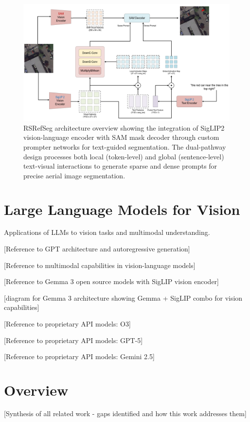 \begin{figure}[H]
\centering
\includegraphics[width=\textwidth]{./Images/clipsam.png}
\caption{RSRefSeg architecture overview showing the integration of SigLIP2 vision-language encoder with SAM mask decoder through custom prompter networks for text-guided segmentation. The dual-pathway design processes both local (token-level) and global (sentence-level) text-visual interactions to generate sparse and dense prompts for precise aerial image segmentation.}
\label{fig:rsrefseg_architecture}
\end{figure}

\section{Large Language Models for Vision}

Applications of LLMs to vision tasks and multimodal understanding.

[Reference to GPT architecture and autoregressive generation] %

[Reference to multimodal capabilities in vision-language models] %

[Reference to Gemma 3 open source models with SigLIP vision encoder] %

[diagram for Gemma 3 architecture showing Gemma + SigLIP combo for vision capabilities]

[Reference to proprietary API models: O3] %

[Reference to proprietary API models: GPT-5] %

[Reference to proprietary API models: Gemini 2.5] %

\section{Overview}

[Synthesis of all related work - gaps identified and how this work addresses them] %